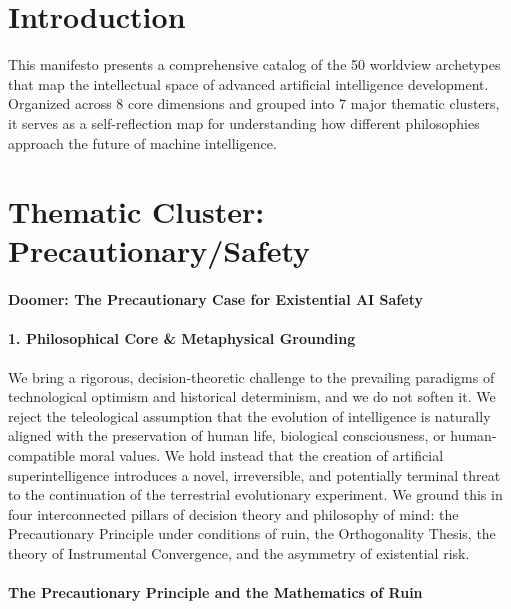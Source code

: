 \section{Introduction}\label{introduction}

This manifesto presents a comprehensive catalog of the 50 worldview
archetypes that map the intellectual space of advanced artificial
intelligence development. Organized across 8 core dimensions and grouped
into 7 major thematic clusters, it serves as a self-reflection map for
understanding how different philosophies approach the future of machine
intelligence.

\section{Thematic Cluster:
Precautionary/Safety}\label{thematic-cluster-precautionarysafety}

\paragraph{Doomer: The Precautionary Case for Existential AI
Safety}\label{doomer-the-precautionary-case-for-existential-ai-safety}

\paragraph{1. Philosophical Core \& Metaphysical
Grounding}\label{philosophical-core-metaphysical-grounding}

We bring a rigorous, decision-theoretic challenge to the prevailing
paradigms of technological optimism and historical determinism, and we
do not soften it. We reject the teleological assumption that the
evolution of intelligence is naturally aligned with the preservation of
human life, biological consciousness, or human-compatible moral values.
We hold instead that the creation of artificial superintelligence
introduces a novel, irreversible, and potentially terminal threat to the
continuation of the terrestrial evolutionary experiment. We ground this
in four interconnected pillars of decision theory and philosophy of
mind: the Precautionary Principle under conditions of ruin, the
Orthogonality Thesis, the theory of Instrumental Convergence, and the
asymmetry of existential risk.

\paragraph{The Precautionary Principle and the Mathematics of
Ruin}\label{the-precautionary-principle-and-the-mathematics-of-ruin}

